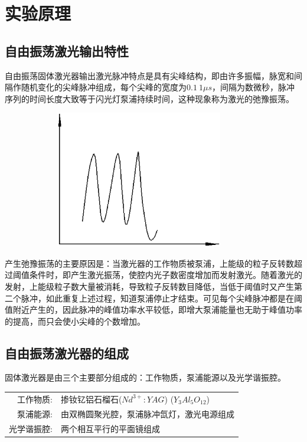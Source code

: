 \documentclass[UTF8]{ctexart}
\makeatletter
\newcommand{\figcaption}{\def\@captype{figure}\caption}
\makeatother
\begin{document}
\section{实验原理}
	\subsection{自由振荡激光输出特性}

自由振荡固体激光器输出激光脉冲特点是具有尖峰结构，即由许多振幅，脉宽和间隔作随机变化的尖峰脉冲组成，每个尖峰的宽度为$0.1~1\mu s$，间隔为数微秒，脉冲序列的时间长度大致等于闪光灯泵浦持续时间，这种现象称为激光的弛豫振荡。
	\begin{center}
		\includegraphics[width=12cm,height=6cm]{free.eps}
		\figcaption{激光自由振荡特性}\label{free.png}
	\end{center}
	
产生弛豫振荡的主要原因是：当激光器的工作物质被泵浦，上能级的粒子反转数超过阈值条件时，即产生激光振荡，使腔内光子数密度增加而发射激光。随着激光的发射，上能级粒子数大量被消耗，导致粒子反转数目降低，当低于阈值时又产生第二个脉冲，如此重复上述过程，知道泵浦停止才结束。可见每个尖峰脉冲都是在阈值附近产生的，因此脉冲的峰值功率水平较低，即增大泵浦能量也无助于峰值功率的提高，而只会使小尖峰的个数增加。
	
\subsection{自由振荡激光器的组成}
	
固体激光器是由三个主要部分组成的：工作物质，泵浦能源以及光学谐振腔。


\begin{tabular}{rl}
	工作物质:&掺钕钇铝石榴石($Nd^{3+}: YAG$) ($Y_{3}Al_{5}O_{12}$)\\
	泵浦能源:&由双椭圆聚光腔，泵浦脉冲氙灯，激光电源组成\\
	光学谐振腔:&两个相互平行的平面镜组成\\
\end{tabular}
\end{document}
